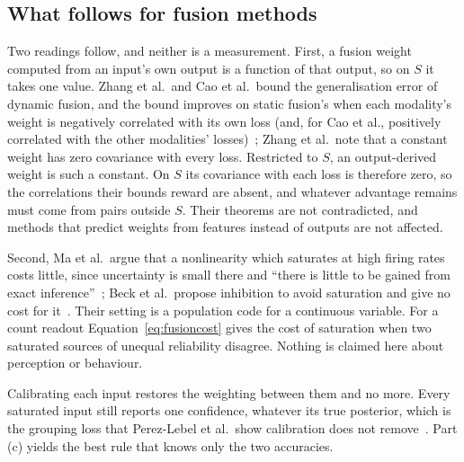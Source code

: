 \subsection{What follows for fusion methods}
\label{app:fusionmethods}

Two readings follow, and neither is a measurement. First, a fusion weight computed from an
input's own output is a function of that output, so on $S$ it takes one value. Zhang et al.\
and Cao et al.\ bound the generalisation error of dynamic fusion, and the bound improves on
static fusion's when each modality's weight is negatively correlated with its own loss (and, for
Cao et al., positively correlated with the other modalities'
losses)~\citep{zhang2023provable,cao2024predictive}; %
Zhang et al.\ note that a constant weight has zero covariance with every loss. Restricted to
$S$, an output-derived weight is such a constant. On $S$ its covariance with each loss is
therefore zero, so the correlations their bounds reward are absent, and whatever advantage
remains must come from pairs outside $S$. Their theorems are not contradicted, and methods that predict weights
from features instead of outputs are not affected.

Second, Ma et al.\ argue that a
nonlinearity which saturates at high firing rates costs little, since uncertainty is small
there and ``there is little to be gained from exact inference''~\citep{ma2006bayesian}; Beck et %
al.\ propose inhibition to avoid saturation and give no cost for it~\citep{beck2008probabilistic}. %
Their setting is a population code for a continuous variable. For a count
readout Equation~\eqref{eq:fusioncost} gives the cost of saturation when two saturated sources of
unequal reliability disagree. Nothing is claimed here about
perception or behaviour.

Calibrating each input restores the weighting between them and no more. Every saturated
input still reports one confidence, whatever its true posterior, which is the grouping loss
that Perez-Lebel et al.\ show calibration does not remove~\citep{perezlebel2023beyond}. %
Part (c) yields the best rule that knows only the two accuracies.

